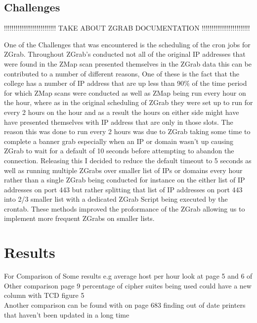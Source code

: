 \documentclass[a4wide,leqno,12pt]{report}
\begin{document}
\section{Challenges}

!!!!!!!!!!!!!!!!!!!!!!!!!!! TAKE ABOUT ZGRAB DOCUMENTATION !!!!!!!!!!!!!!!!!!!!!!!!!


One of the Challenges that was encountered is the scheduling of the cron jobs for ZGrab. Throughout ZGrab's conducted not all of the original IP addresses that were found in the ZMap scan presented themselves in the ZGrab data this can be contributed to a number of different reasons, One of these is the fact that the college has a number of IP address that are up less than 90\% of the time period for which ZMap scans were conducted as well as ZMap being run every hour on the hour, where as in the original scheduling of ZGrab they were set up to run for every 2 hours on the hour and as a result the hours on either side might have have presented themselves with IP address that are only in those slots. The reason this was done to run every 2 hours was due to ZGrab taking some time to complete a banner grab especially when an IP or domain wasn't up causing ZGrab to wait for a default of 10 seconds before attempting to abandon the connection. Releasing this I decided to reduce the default timeout to 5 seconds as  well as running multiple ZGrabs over smaller list of IPs or domains every hour rather than a single ZGrab being conducted for instance on the either list of IP addresses on port 443 but rather splitting that list of IP addresses on port 443 into 2/3 smaller list with a dedicated ZGrab Script being executed by the crontab. These methods improved the proformance of the ZGrab allowing us to implement more frequent ZGrabs on smaller lists.

\chapter{Results}

For Comparison of Some results e.g average host per hour look at page 5 and 6 of \cite{durumeric2013zmap}\\

Other comparison \cite{durumeric2015search} page 9 percentage of cipher suites being used could have a new column with TCD figure 5\\

Another comparison can be found with \cite{lee2016implementation} on page 683 finding out of date printers that haven't been updated in a long time\\
\end{document}
